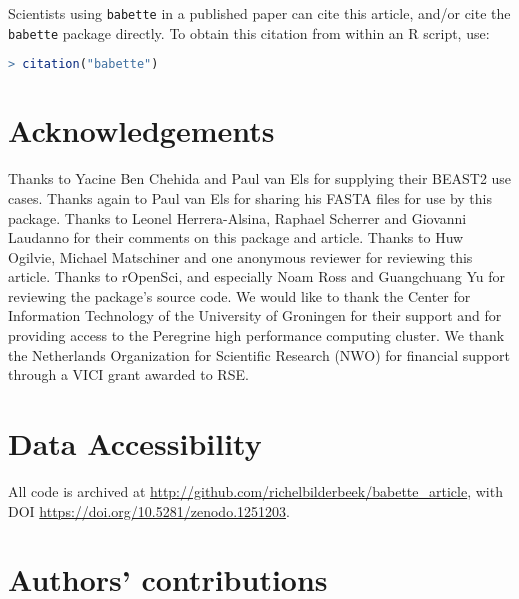 \documentclass{article}
\begin{document}
Scientists using \verb;babette; in a published paper can cite this
article, and/or cite the \verb;babette; package 
directly. To obtain this citation from within an R script, use:

\begin{lstlisting}[language=R]
> citation("babette")
\end{lstlisting}

\section{Acknowledgements}

Thanks to Yacine Ben Chehida and Paul van Els for supplying their 
BEAST2 use cases. Thanks again to Paul van Els for sharing his FASTA files 
for use by this package. Thanks to Leonel Herrera-Alsina, Raphael Scherrer 
and Giovanni Laudanno for their comments on this package and article.
Thanks to Huw Ogilvie, Michael Matschiner and one anonymous reviewer for reviewing this article.
Thanks to rOpenSci, and especially Noam Ross and Guangchuang Yu for reviewing the package's source code.
We would like to thank the Center for Information Technology of the University 
of Groningen for their support and for providing access to the Peregrine 
high performance computing cluster. We thank the Netherlands 
Organization for Scientific Research (NWO) for financial support 
through a VICI grant awarded to RSE.

\section{Data Accessibility}

All code is archived at \url{http://github.com/richelbilderbeek/babette_article},
with DOI \url{https://doi.org/10.5281/zenodo.1251203}.

\section{Authors' contributions}
\end{document}
